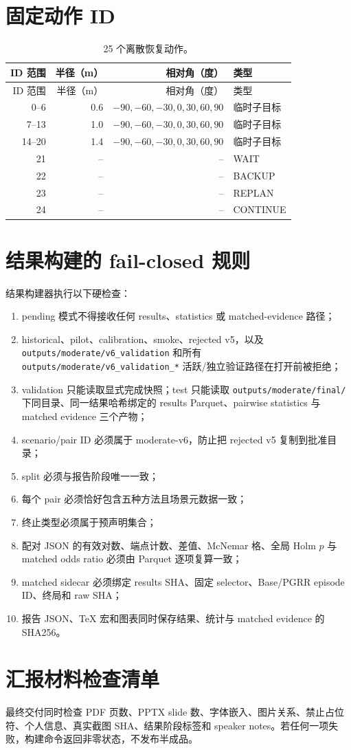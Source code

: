 \documentclass[11pt,a4paper]{article}
\begin{document}
\section{固定动作 ID}
\begin{longtable}{rrrl}
\caption{25 个离散恢复动作。}\label{tab:actions}\\
\toprule
ID 范围 & 半径（m） & 相对角（度） & 类型 \\
\midrule
\endfirsthead
\toprule
ID 范围 & 半径（m） & 相对角（度） & 类型 \\
\midrule
\endhead
0--6 & 0.6 & $-90,-60,-30,0,30,60,90$ & 临时子目标 \\
7--13 & 1.0 & $-90,-60,-30,0,30,60,90$ & 临时子目标 \\
14--20 & 1.4 & $-90,-60,-30,0,30,60,90$ & 临时子目标 \\
21 & -- & -- & WAIT \\
22 & -- & -- & BACKUP \\
23 & -- & -- & REPLAN \\
24 & -- & -- & CONTINUE \\
\bottomrule
\end{longtable}

\section{结果构建的 fail-closed 规则}
结果构建器执行以下硬检查：
\begin{enumerate}
  \item pending 模式不得接收任何 results、statistics 或 matched-evidence 路径；
  \item historical、pilot、calibration、smoke、rejected v5，以及
  \nolinkurl{outputs/moderate/v6_validation} 和所有
  \nolinkurl{outputs/moderate/v6_validation_*} 活跃/独立验证路径在打开前被拒绝；
  \item validation 只能读取显式完成快照；test 只能读取
  \nolinkurl{outputs/moderate/final/} 下同目录、同一结果哈希绑定的
  results Parquet、pairwise statistics 与 matched evidence 三个产物；
  \item scenario/pair ID 必须属于 moderate-v6，防止把 rejected v5 复制到批准目录；
  \item split 必须与报告阶段唯一一致；
  \item 每个 pair 必须恰好包含五种方法且场景元数据一致；
  \item 终止类型必须属于预声明集合；
  \item 配对 JSON 的有效对数、端点计数、差值、McNemar 格、全局 Holm $p$ 与 matched odds ratio 必须由 Parquet 逐项复算一致；
  \item matched sidecar 必须绑定 results SHA、固定 selector、Base/PGRR episode ID、终局和 raw SHA；
  \item 报告 JSON、TeX 宏和图表同时保存结果、统计与 matched evidence 的 SHA256。
\end{enumerate}

\section{汇报材料检查清单}
最终交付同时检查 PDF 页数、PPTX slide 数、字体嵌入、图片关系、禁止占位符、个人信息、真实截图 SHA、结果阶段标签和 speaker notes。若任何一项失败，构建命令返回非零状态，不发布半成品。
\end{document}
